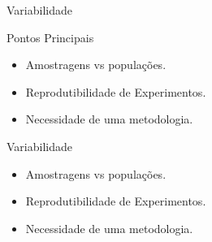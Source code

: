 \documentclass [aspectratio=169]{beamer}
\begin{document}


\begin{frame}{Variabilidade}
    \begin{block}{Pontos Principais}
        \begin{itemize}
            \item Amostragens vs populações.
            \item Reprodutibilidade de Experimentos.
            \item Necessidade de uma metodologia.
        \end{itemize}
    \end{block}
\end{frame}

\begin{frame}{Variabilidade}

        \begin{itemize}
            \item Amostragens vs populações.
            \item Reprodutibilidade de Experimentos.
            \item Necessidade de uma metodologia.
        \end{itemize}

\end{frame}
\end{document}
